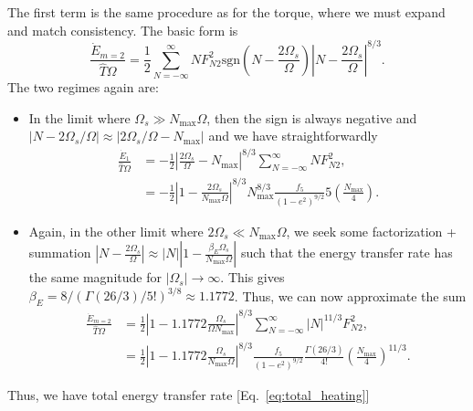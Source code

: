 \documentclass[
        fleqn,
        usenatbib,
        referee,
    ]{mnras}
\newcommand*{\abs}[1]{\left|#1\right|}
\newcommand*{\p}[1]{\left(#1\right)}
\begin{document}
The first term is the same procedure as for the torque, where we must expand and
match consistency. The basic form is
\begin{equation}
    \frac{\dot{E}_{m=2}}{\hat{T}\Omega} = \frac{1}{2}
        \sum\limits_{N = -\infty}^\infty NF_{N2}^2 \mathrm{sgn}\p{N -
            \frac{2\Omega_s}{\Omega}} \abs{N - \frac{2\Omega_s}{\Omega}}^{8/3}.
\end{equation}
The two regimes again are:
\begin{itemize}
    \item In the limit where $\Omega_s \gg N_{\max}\Omega$, then the sign is
        always negative and $\abs{N - 2\Omega_s / \Omega} \approx
        \abs{2\Omega_s / \Omega - N_{\max}}$ and we have straightforwardly
        \begin{align}
            \frac{\dot{E}_1}{\hat{T}\Omega}
                &= -\frac{1}{2}
                    \abs{\frac{2\Omega_s}{\Omega} - N_{\max}}^{8/3}
                    \sum\limits_{N = -\infty}^\infty NF_{N2}^2,\\
                &= -\frac{1}{2}
                    \abs{1 - \frac{2\Omega_s}{N_{\max}\Omega}}^{8/3}
                    N_{\max}^{8/3}
                    \frac{f_5}{\p{1 - e^2}^{9/2}}5\p{\frac{N_{\max}}{4}}.
        \end{align}
    \item Again, in the other limit where $2\Omega_s \ll N_{\max}\Omega$, we
        seek some factorization + summation $\abs{N - \frac{2\Omega_s}{\Omega}}
        \approx \abs{N}\abs{1 - \frac{\beta_E\Omega_s}{N_{\max}\Omega}}$ such
        that the energy transfer rate has the same magnitude for $\abs{\Omega_s}
        \to \infty$. This gives $\beta_E = 8 / \p{\Gamma(26/3) / 5!}^{3/8}
        \approx 1.1772$. Thus, we can now
        approximate the sum
        \begin{align}
            \frac{\dot{E}_{m=2}}{\hat{T}\Omega}
                &= \frac{1}{2}
                    \abs{1 - 1.1772\frac{\Omega_s}{\Omega N_{\max}}}^{8/3}
                    \sum\limits_{N = -\infty}^\infty \abs{N}^{11/3}F_{N2}^2,\\
                &= \frac{1}{2}
                    \abs{1 - 1.1772\frac{\Omega_s}{N_{\max}\Omega}}^{8/3}
                    \frac{f_5}{\p{1 - e^2}^{9/2}}
                    \frac{\Gamma(26/3)}{4!}\p{\frac{N_{\max}}{4}}^{11/3}.
        \end{align}
\end{itemize}
Thus, we have total energy transfer rate [Eq.~\eqref{eq:total_heating}]
\end{document}
